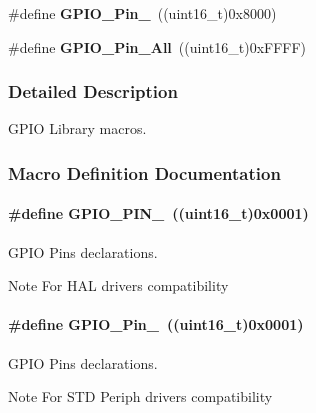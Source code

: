 \begin{DoxyCompactItemize}
\item 
\hypertarget{group___t_m___g_p_i_o___macros_gae686a9fc47cf3e420e5db0784210711d}{}\#define {\bfseries G\+P\+I\+O\+\_\+\+Pin\+\_}~((uint16\+\_\+t)0x8000)\label{group___t_m___g_p_i_o___macros_gae686a9fc47cf3e420e5db0784210711d}

\item 
\hypertarget{group___t_m___g_p_i_o___macros_gaba3e915ddca17a1211edc07b7fd97e8b}{}\#define {\bfseries G\+P\+I\+O\+\_\+\+Pin\+\_\+\+All}~((uint16\+\_\+t)0x\+F\+F\+F\+F)\label{group___t_m___g_p_i_o___macros_gaba3e915ddca17a1211edc07b7fd97e8b}

\end{DoxyCompactItemize}


\subsubsection{Detailed Description}
G\+P\+I\+O Library macros. 



\subsubsection{Macro Definition Documentation}
\hypertarget{group___t_m___g_p_i_o___macros_ga176efbf43a259b7bb0a85a47401505be}{}
\paragraph[{G\+P\+I\+O\+\_\+\+P\+I\+N\+\_\+0}]{\setlength{\rightskip}{0pt plus 5cm}\#define G\+P\+I\+O\+\_\+\+P\+I\+N\+\_~((uint16\+\_\+t)0x0001)}\label{group___t_m___g_p_i_o___macros_ga176efbf43a259b7bb0a85a47401505be}


G\+P\+I\+O Pins declarations. 

\begin{DoxyNote}{Note}
For H\+A\+L drivers compatibility 
\end{DoxyNote}
\hypertarget{group___t_m___g_p_i_o___macros_gab305b8d1be9f89bf2b4a05589b456049}{}
\paragraph[{G\+P\+I\+O\+\_\+\+Pin\+\_\+0}]{\setlength{\rightskip}{0pt plus 5cm}\#define G\+P\+I\+O\+\_\+\+Pin\+\_~((uint16\+\_\+t)0x0001)}\label{group___t_m___g_p_i_o___macros_gab305b8d1be9f89bf2b4a05589b456049}


G\+P\+I\+O Pins declarations. 

\begin{DoxyNote}{Note}
For S\+T\+D Periph drivers compatibility 
\end{DoxyNote}
